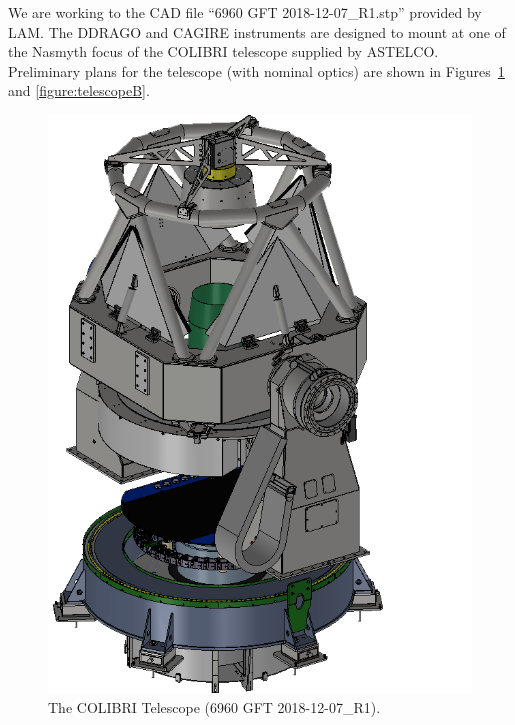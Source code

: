 \documentclass{report}
\begin{document}
We are working to the CAD file “6960 GFT 2018-12-07\_R1.stp” provided by LAM. The DDRAGO and CAGIRE instruments are designed to mount at one of the Nasmyth focus of the COLIBRI telescope supplied by ASTELCO. Preliminary plans for the telescope (with nominal optics) are shown in Figures~\ref{figure:telescopeA} and \ref{figure:telescopeB}.

\begin{figure}
\begin{center}
\includegraphics[width=\linewidth]{figures/Telescope-000.png}
\end{center}
\caption{The COLIBRI Telescope (6960 GFT 2018-12-07\_R1).}
\label{figure:telescopeA}
\end{figure}
\end{document}
